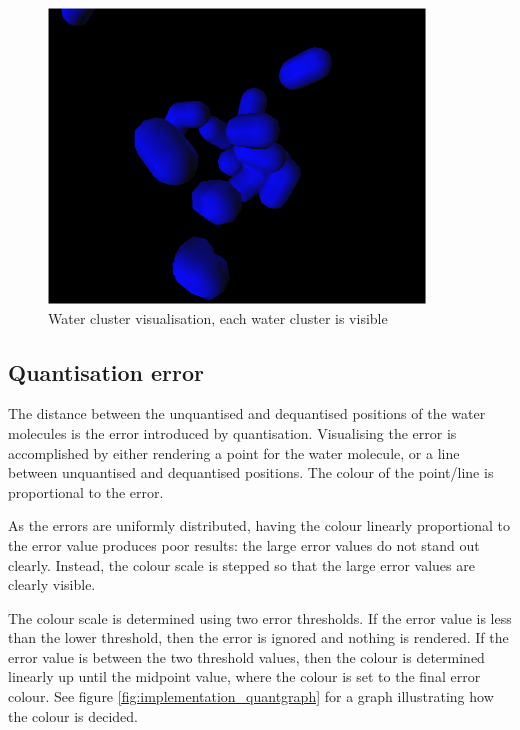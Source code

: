 \begin{figure}[h!]
  \begin{center}
    \includegraphics[width=100mm]{watercluster}
  \end{center}
  \caption{Water cluster visualisation, each water cluster is visible}
  \label{fig:implementation_watercluster}
\end{figure}


\subsection{Quantisation error}
\label{sub:implementation_quantisation}

The distance between the unquantised and dequantised positions of the water
molecules is the error introduced by quantisation. Visualising the error is
accomplished by either rendering a point for the water molecule, or a line
between unquantised and dequantised positions. The colour of the point/line is
proportional to the error.

As the errors are uniformly distributed, having the colour linearly
proportional to the error value produces poor results: the large error values
do not stand out clearly. Instead, the colour scale is stepped so that the
large error values are clearly visible.

The colour scale is determined using two error thresholds. If the error value
is less than the lower threshold, then the error is ignored and nothing is
rendered. If the error value is between the two threshold values, then the
colour is determined linearly up until the midpoint value, where the colour is
set to the final error colour. See figure \ref{fig:implementation_quantgraph}
for a graph illustrating how the colour is decided.


